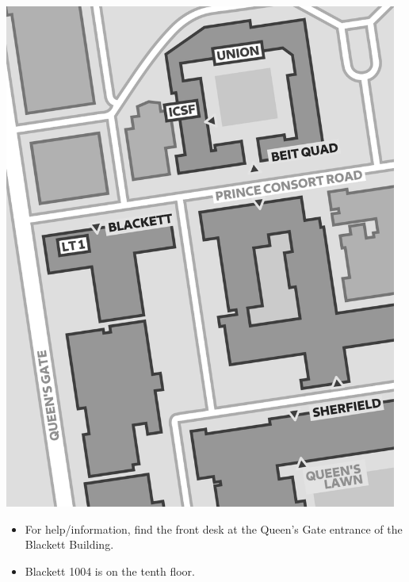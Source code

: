 \begin{center}
  \includegraphics[width=0.97\textwidth]{img/map}
\end{center}
\begin{minipage}{0.6\textwidth}
  \small
  \begin{itemize}
  \item For help/information, find the front desk at the Queen's Gate entrance of the Blackett Building.
  \item Blackett 1004 is on the tenth floor.
  \end{itemize}
\end{minipage}
